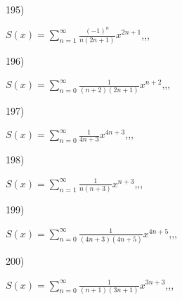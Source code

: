 \documentclass[11pt, ukrainian]{article}
\begin{document}
195) \space 
{%
{$S(x)=\sum\limits_{n=1}^{\infty}{\frac{(-1)^n}{n(2n+1)}}{x^{{2n+1}}}$},,, \par \smallskip  
}
\par
\vspace{0.9cm}
196) \space 
{%
{$S(x)=\sum\limits_{n=0}^{\infty}{\frac{1}{(n+2)(2n+1)}}{x^{{n+2}}}$},,, \par \smallskip  
}
\par
\vspace{0.9cm}
197) \space 
{%
{$S(x)=\sum\limits_{n=0}^{\infty}{\frac{1}{4n+3}}{x^{{4n+3}}}$},,, \par \smallskip  
}
\par
\vspace{0.9cm}
198) \space 
{%
{$S(x)=\sum\limits_{n=1}^{\infty}{\frac{1}{n(n+3)}}{x^{{n+3}}}$},,, \par \smallskip  
}
\par
\vspace{0.9cm}
199) \space 
{%
{$S(x)=\sum\limits_{n=0}^{\infty}{\frac{1}{(4n+3)(4n+5)}}{x^{{4n+5}}}$},,, \par \smallskip  
}
\par
\vspace{0.9cm}
200) \space 
{%
{$S(x)=\sum\limits_{n=0}^{\infty}{\frac{1}{(n+1)(3n+1)}}{x^{{3n+3}}}$},,, \par \smallskip  
}
\end{document}
